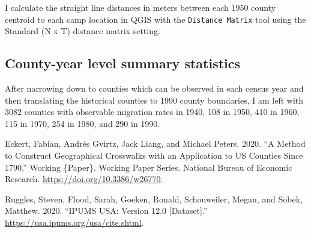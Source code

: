 \documentclass[
]{article}
\newlength{\cslhangindent}
\newenvironment{CSLReferences}[2] %
 {\begin{list}{}{%
  \setlength{\itemindent}{0pt}
  \setlength{\leftmargin}{0pt}
  \setlength{\parsep}{0pt}
  \ifodd #1
   \setlength{\leftmargin}{\cslhangindent}
   \setlength{\itemindent}{-1\cslhangindent}
  \fi
  \setlength{\itemsep}{#2\baselineskip}}}
 {\end{list}}
\begin{document}
I calculate the straight line distances in meters between each 1950
county centroid to each camp location in QGIS with the
\texttt{Distance\ Matrix} tool using the Standard (N x T) distance
matrix setting.

\subsection{County-year level summary
statistics}\label{county-year-level-summary-statistics}

After narrowing down to counties which can be observed in each census
year and then translating the historical counties to 1990 county
boundaries, I am left with 3082 counties with observable migration rates
in 1940, 108 in 1950, 410 in 1960, 115 in 1970, 254 in 1980, and 290 in
1990.

\label{refs}
\begin{CSLReferences}{1}{0}
Eckert, Fabian, Andrés Gvirtz, Jack Liang, and Michael Peters. 2020.
{``A {Method} to {Construct} {Geographical} {Crosswalks} with an
{Application} to {US} {Counties} Since 1790.''} Working \{Paper\}.
Working {Paper} {Series}. National Bureau of Economic Research.
\url{https://doi.org/10.3386/w26770}.

Ruggles, Steven, Flood, Sarah, Goeken, Ronald, Schouweiler, Megan, and
Sobek, Matthew. 2020. {``{IPUMS} {USA}: {Version} 12.0 {[}Dataset{]}.''}
\url{https://usa.ipums.org/usa/cite.shtml}.

\end{CSLReferences}
\end{document}
